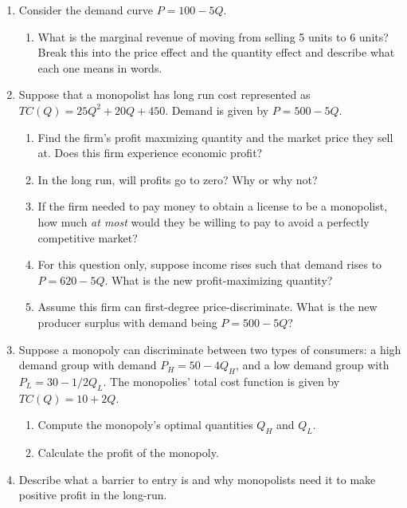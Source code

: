 \documentclass[11pt]{article}
\begin{document}
\begin{enumerate}
  \item Consider the demand curve $P = 100 - 5Q$.
  
  \begin{enumerate}
    \item What is the marginal revenue of moving from selling 5 units to 6 units? Break this into the price effect and the quantity effect and describe what each one means in words. 
  \end{enumerate}

  \item Suppose that a monopolist has long run cost represented as $TC(Q) = 25Q^2 + 20Q + 450$. Demand is given by $P = 500 - 5Q$. 

  \begin{enumerate}
    \item Find the firm's profit maxmizing quantity and the market price they sell at. Does this firm experience economic profit?
    
    \item In the long run, will profits go to zero? Why or why not?
    
    \item If the firm needed to pay money to obtain a license to be a monopolist, how much \emph{at most} would they be willing to pay to avoid a perfectly competitive market?
    
    \item For this question only, suppose income rises such that demand rises to $P = 620 - 5Q$. What is the new profit-maximizing quantity?
    
    \item Assume this firm can first-degree price-discriminate. What is the new producer surplus with demand being $P = 500 - 5Q$?
  \end{enumerate}

  \item Suppose a monopoly can discriminate between two types of consumers: a high demand group with demand $P_H = 50 - 4Q_H$, and a low demand
  group with $P_L = 30 - 1/2 Q_L$. The monopolies' total cost function is given by $TC(Q) = 10 + 2Q$. 
  
  \begin{enumerate}
    \item Compute the monopoly's optimal quantities $Q_H$ and $Q_L$.
    
    \item Calculate the profit of the monopoly.
  \end{enumerate}

  \item Describe what a barrier to entry is and why monopolists need it to make positive profit in the long-run.
\end{enumerate}
\end{document}
